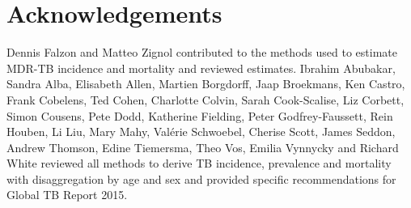 \section*{Acknowledgements}

Dennis Falzon and Matteo Zignol contributed to the methods used to estimate MDR-TB incidence and mortality and reviewed estimates. Ibrahim Abubakar, Sandra Alba, Elisabeth Allen, Martien Borgdorff, Jaap Broekmans, Ken Castro, Frank Cobelens, Ted Cohen, Charlotte Colvin, Sarah Cook-Scalise, Liz Corbett, Simon Cousens, Pete Dodd, Katherine Fielding, Peter Godfrey-Faussett, Rein Houben, Li Liu, Mary Mahy, Valérie Schwoebel, Cherise Scott, James Seddon, Andrew Thomson, Edine Tiemersma, Theo Vos, Emilia Vynnycky and Richard White reviewed all methods to derive TB incidence, prevalence and mortality with disaggregation by age and sex and provided specific recommendations for Global TB Report 2015.